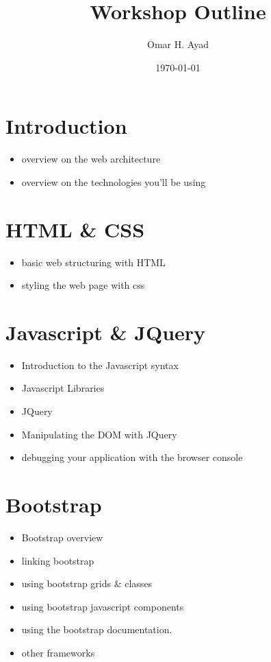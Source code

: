 \documentclass{article}
\begin{document}
\title{Workshop Outline}
\author{Omar H. Ayad}
\date{\today}
\maketitle

\section{Introduction}
	\begin{itemize}
		\item overview on the web architecture
		\item overview on the technologies you'll be using
	\end{itemize}

\section{HTML \& CSS}
	\begin{itemize}
		\item basic web structuring with HTML
		\item styling the web page with css
	\end{itemize}

\section{Javascript \& JQuery}
	\begin{itemize}
		\item Introduction to the Javascript syntax
		\item Javascript Libraries
		\item JQuery
		\item Manipulating the DOM with JQuery
		\item debugging your application with the browser console
	\end{itemize}

\section{Bootstrap}
	\begin{itemize}
		\item Bootstrap overview
		\item linking bootstrap
		\item using bootstrap grids \& classes
		\item using bootstrap javascript components
		\item using the bootstrap documentation.
		\item other frameworks
	\end{itemize}
\end{document}
